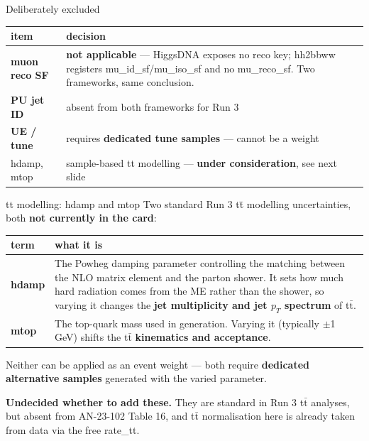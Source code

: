 \documentclass[aspectratio=169,10pt]{beamer}
\newcommand{\code}[1]{{\ttfamily\small\colorbox{codebg}{#1}}}
\begin{document}
\begin{frame}{Deliberately excluded}
\vspace{0.3em}
\begin{center}
\scriptsize
\begin{tabular}{p{}p{}}
\toprule
item & decision \\
\midrule
\textbf{muon reco SF} & \textbf{not applicable} --- HiggsDNA exposes no reco key;
hh2bbww registers \code{mu\_id\_sf}/\code{mu\_iso\_sf} and no \code{mu\_reco\_sf}.
Two frameworks, same conclusion. \\
\textbf{PU jet ID} & absent from both frameworks for Run 3 \\
\textbf{UE / tune} & requires \textbf{dedicated tune samples} --- cannot be a weight \\
\code{hdamp}, \code{mtop} & sample-based tt modelling --- \textbf{under
consideration}, see next slide \\
\bottomrule
\end{tabular}
\end{center}
\end{frame}

\begin{frame}{tt modelling: \code{hdamp} and \code{mtop}}
{\small Two standard Run 3 tt̄ modelling uncertainties, both \textbf{not currently in
the card}:}
\vspace{0.2em}
\begin{center}
\scriptsize
\begin{tabular}{p{}p{}}
\toprule
term & what it is \\
\midrule
\textbf{\code{hdamp}} & The Powheg damping parameter controlling the matching between
the NLO matrix element and the parton shower. It sets how much hard radiation comes
from the ME rather than the shower, so varying it changes the \textbf{jet
multiplicity and jet $p_T$ spectrum} of t$\bar{\text{t}}$. \\
\textbf{\code{mtop}} & The top-quark mass used in generation. Varying it (typically
$\pm$1 GeV) shifts the t$\bar{\text{t}}$ \textbf{kinematics and acceptance}. \\
\bottomrule
\end{tabular}
\end{center}
\vspace{0.2em}
{\small Neither can be applied as an event weight --- both require \textbf{dedicated
alternative samples} generated with the varied parameter.}
\begin{warnbox}
\textbf{Undecided whether to add these.} They are standard in Run 3 t$\bar{\text{t}}$
analyses, but absent from AN-23-102 Table 16, and t$\bar{\text{t}}$ normalisation
here is already taken from data via the free \code{rate\_tt}.
\end{warnbox}
\end{frame}
\end{document}
